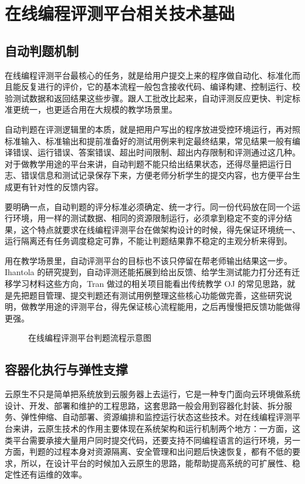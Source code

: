 \chapter{在线编程评测平台相关技术基础}

\section{自动判题机制}

在线编程评测平台最核心的任务，就是给用户提交上来的程序做自动化、标准化而且能反复进行的评价，它的基本流程一般包含接收代码、编译构建、控制运行、校验测试数据和返回结果这些步骤。跟人工批改比起来，自动评测反应更快、判定标准更统一，也更适合用在大规模的教学场景里\cite{kurnia2001online,leal2003mooshak,ala2005survey}。

自动判题在评测逻辑里的本质，就是把用户写出的程序放进受控环境运行，再对照标准输入、标准输出和提前准备好的测试用例来判定最终结果，常见结果一般有编译错误、运行错误、答案错误、超出时间限制、超出内存限制和评测通过这几种。对于做教学用途的平台来讲，自动判题不能只给出结果状态，还得尽量把运行日志、错误信息和测试记录保存下来，方便老师分析学生的提交内容，也方便平台生成更有针对性的反馈内容。

要明确一点，自动判题的评分标准必须确定、统一才行。同一份代码放在同一个运行环境，用一样的测试数据、相同的资源限制运行，必须拿到稳定不变的评分结果，这个特点就要求在线编程评测平台在做架构设计的时候，得先保证环境统一、运行隔离还有任务调度稳定可靠，不能让判题结果靠不稳定的主观分析来得到。

用在教学场景里，自动评测平台的目标也不该只停留在帮老师输出结果这一步。Ihantola 的研究提到，自动评测还能拓展到给出反馈、给学生测试能力打分还有迁移学习材料这些方向\cite{ihantola2011automated}，Tran 做过的相关项目能看出传统教学 OJ 的常见思路，就是先把题目管理、提交判题还有测试用例整理这些核心功能做完善\cite{tran2013uoj}，这些研究说明，做教学用途的评测平台，得先保证核心流程能用，之后再慢慢把反馈功能做得更强。

\begin{figure}[htbp]
  \centering
  \resizebox{0.96\textwidth}{!}{}
  \caption{在线编程评测平台判题流程示意图}
  \label{fig:ch2-judge-pipeline}
\end{figure}

\section{容器化执行与弹性支撑}

云原生不只是简单把系统放到云服务器上去运行，它是一种专门面向云环境做系统设计、开发、部署和维护的工程思路，这套思路一般会用到容器化封装、拆分服务、弹性伸缩、自动部署、资源编排和监控运行状态这些技术。对在线编程评测平台来讲，云原生技术的作用主要体现在系统架构和运行机制两个地方：一方面，这类平台需要承接大量用户同时提交代码，还要支持不同编程语言的运行环境，另一方面，判题的过程本身对资源隔离、安全管理和出问题后快速恢复，都有不低的要求，所以，在设计平台的时候加入云原生的思路，能帮助提高系统的可扩展性、稳定性还有运维的效率\cite{burns2016borg,hezhenwei2020kubernetes}。

